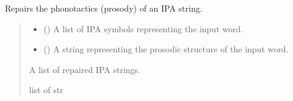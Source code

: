 \documentclass[letterpaper,10pt,english]{sphinxmanual}
\begin{document}
\begin{fulllineitems}
\begin{fulllineitems}
\label{\detokenize{documentation:loanpy.scapplier.Adrc.repair_phonotactics}}
\pysigstartsignatures
{}
\pysigstopsignatures
\sphinxAtStartPar
Repairs the phonotactics (prosody) of an IPA string.
\begin{quote}\begin{description}
\begin{itemize}
\item {} 
\sphinxAtStartPar
{} () \textendash{} A list of IPA symbols representing the input word.

\item {} 
\sphinxAtStartPar
{} () \textendash{} A string representing the prosodic structure of the
input word.

\end{itemize}

\sphinxAtStartPar
A list of repaired IPA strings.

\sphinxAtStartPar
list of str

\end{description}\end{quote}

\sphinxAtStartPar
{}


\end{fulllineitems}
\end{fulllineitems}
\end{document}
